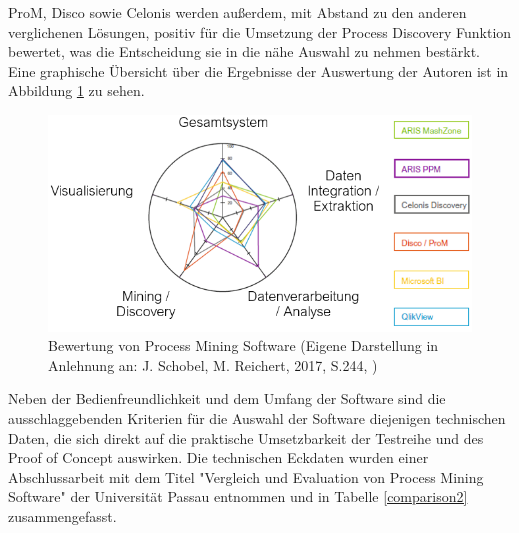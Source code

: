 ProM, Disco sowie Celonis werden außerdem, mit Abstand zu den anderen verglichenen Lösungen, positiv für die Umsetzung der Process Discovery Funktion bewertet, was die Entscheidung sie in die nähe Auswahl zu nehmen bestärkt. Eine graphische Übersicht über die Ergebnisse der Auswertung der Autoren ist in Abbildung \ref{fig:toolEval} zu sehen.
\begin{figure}[!ht]
    \centering
    \includegraphics[scale=0.6]{figures/Appbildungen/toolEval.PNG}
    \caption{Bewertung von Process Mining Software (Eigene Darstellung in Anlehnung an: J. Schobel, M. Reichert, 2017, S.244, \cite{Schobel2017})}
    \label{fig:toolEval}
\end{figure}
\newpage
Neben der Bedienfreundlichkeit und dem Umfang der Software sind die ausschlaggebenden Kriterien für die Auswahl der Software diejenigen technischen Daten, die sich direkt auf die praktische Umsetzbarkeit der Testreihe und des Proof of Concept auswirken. Die technischen Eckdaten wurden einer  Abschlussarbeit mit dem Titel "Vergleich und Evaluation von Process Mining Software" der Universität Passau entnommen \cite{compPM} und in Tabelle \ref{comparison2} zusammengefasst.

\begin{table}[!h]
\centering
{}
\caption{Gegenüberstellung von technischen Eigenschaften der populärsten Process Mining Lösungen(Quelle: Erling C., Vergleich und Evaluation von Process Mining Software, 2019, S. 36,37,44,83 \ref{comparison2})}
\label{comparison2}
\end{table}

